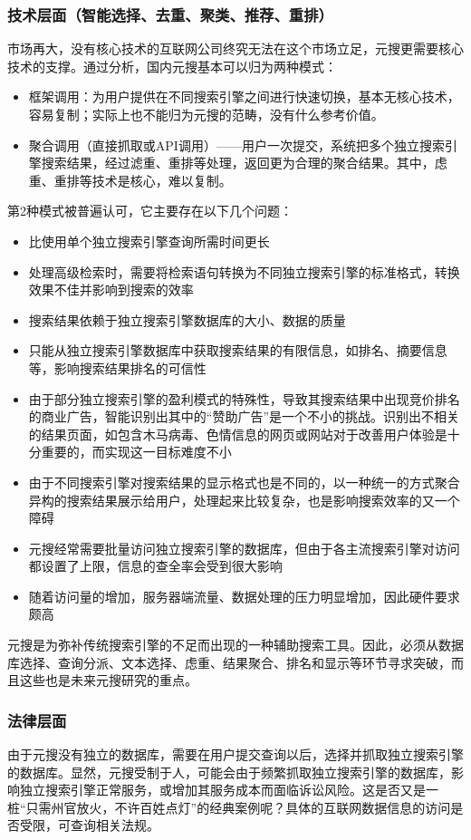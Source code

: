 \subsubsection{技术层面（智能选择、去重、聚类、推荐、重排）}
市场再大，没有核心技术的互联网公司终究无法在这个市场立足，元搜更需要核心技术的支撑。通过分析，国内元搜基本可以归为两种模式：
\begin{itemize}
  \item 框架调用：为用户提供在不同搜索引擎之间进行快速切换，基本无核心技术，容易复制；实际上也不能归为元搜的范畴，没有什么参考价值。
  \item 聚合调用（直接抓取或API调用）——用户一次提交，系统把多个独立搜索引擎搜索结果，经过滤重、重排等处理，返回更为合理的聚合结果。其中，虑重、重排等技术是核心，难以复制。
\end{itemize}
第2种模式被普遍认可，它主要存在以下几个问题：
\begin{itemize}
  \item 比使用单个独立搜索引擎查询所需时间更长
  \item 处理高级检索时，需要将检索语句转换为不同独立搜索引擎的标准格式，转换效果不佳并影响到搜索的效率
  \item 搜索结果依赖于独立搜索引擎数据库的大小、数据的质量
  \item 只能从独立搜索引擎数据库中获取搜索结果的有限信息，如排名、摘要信息等，影响搜索结果排名的可信性
  \item 由于部分独立搜索引擎的盈利模式的特殊性，导致其搜索结果中出现竞价排名的商业广告，智能识别出其中的“赞助广告”是一个不小的挑战。识别出不相关的结果页面，如包含木马病毒、色情信息的网页或网站对于改善用户体验是十分重要的，而实现这一目标难度不小
  \item 由于不同搜索引擎对搜索结果的显示格式也是不同的，以一种统一的方式聚合异构的搜索结果展示给用户，处理起来比较复杂，也是影响搜索效率的又一个障碍
  \item 元搜经常需要批量访问独立搜索引擎的数据库，但由于各主流搜索引擎对访问都设置了上限，信息的查全率会受到很大影响
  \item 随着访问量的增加，服务器端流量、数据处理的压力明显增加，因此硬件要求颇高
\end{itemize}
元搜是为弥补传统搜索引擎的不足而出现的一种辅助搜索工具。因此，必须从数据库选择、查询分派、文本选择、虑重、结果聚合、排名和显示等环节寻求突破，而且这些也是未来元搜研究的重点。

\subsubsection{法律层面}
由于元搜没有独立的数据库，需要在用户提交查询以后，选择并抓取独立搜索引擎的数据库。显然，元搜受制于人，可能会由于频繁抓取独立搜索引擎的数据库，影响独立搜索引擎正常服务，或增加其服务成本而面临诉讼风险。这是否又是一桩“只需州官放火，不许百姓点灯”的经典案例呢？具体的互联网数据信息的访问是否受限，可查询相关法规。


